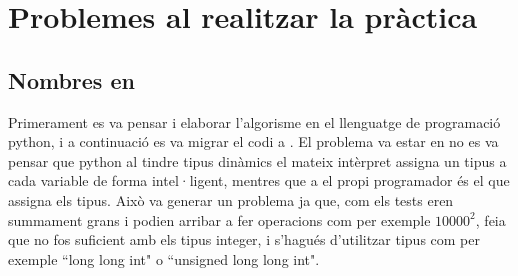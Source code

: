 \documentclass[12pt, letterpaper]{article}
\begin{document}
\section{Problemes al realitzar la pràctica}
\subsection{Nombres en \cpluspluslogo}
Primerament es va pensar i elaborar l'algorisme en el llenguatge de programació python, i a continuació es va migrar el codi a \cpluspluslogo. El problema va estar en no es va pensar que python al tindre tipus dinàmics el mateix intèrpret assigna un tipus a cada variable de forma intel·ligent, mentres que a \cpluspluslogo el propi programador és el que assigna els tipus. Això va generar un problema ja que, com els tests eren summament grans i podien arribar a fer operacions com per exemple $10000^{2}$, feia que no fos suficient amb els tipus integer, i s'hagués d'utilitzar tipus com per exemple ``long long int" o ``unsigned long long int".
\end{document}
